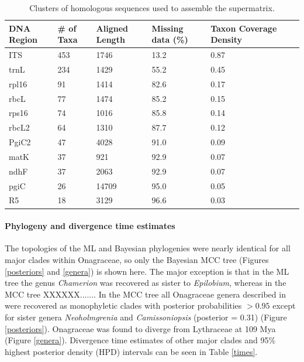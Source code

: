 \documentclass[review]{elsarticle}
\begin{document}
\begin{table}
   \center
   \begin{adjustbox}{max width=\textwidth}
      \begin{tabular}{lllllll}
         \toprule
         DNA Region & \# of Taxa & Aligned Length & Missing data (\%) & Taxon Coverage Density \\ 
	 \midrule
         ITS & 453 & 1746 & 13.2 & 0.87 \\
         trnL & 234 & 1429 & 55.2 & 0.45 \\
         rpl16 & 91 & 1414 & 82.6 & 0.17 \\
         rbcL & 77 & 1474 & 85.2 & 0.15 \\
         rps16 & 74 & 1016 & 85.8 & 0.14 \\
         rbcL2 & 64 & 1310 & 87.7 & 0.12 \\
         PgiC2 & 47 & 4028 & 91.0 & 0.09 \\
         matK & 37 & 921 & 92.9 & 0.07 \\
         ndhF & 37 & 2063 & 92.9 & 0.07 \\
         pgiC & 26 & 14709 & 95.0 & 0.05 \\
         R5 & 18 & 3129 & 96.6 & 0.03 \\
         \bottomrule
      \end{tabular}
   \end{adjustbox}
   \caption{Clusters of homologous sequences used to assemble the supermatrix.}
   \label{clusters}
\end{table}

\paragraph{Phylogeny and divergence time estimates}
The topologies of the ML and Bayesian phylogenies were nearly identical for all major clades within Onagraceae, 
so only the Bayesian MCC tree (Figures \ref{posteriors} and \ref{genera}) is shown here.
The major exception is that in the ML tree the genus \textit{Chamerion} was recovered
as sister to \textit{Epilobium}, whereas in the MCC tree XXXXXX.......
In the MCC tree all Onagraceae genera described in \citet{wagner2007revised} were recovered as monophyletic clades with posterior probabilities $> 0.95$
except for sister genera \textit{Neoholmgrenia} and \textit{Camissoniopsis} (posterior = 0.31) (Figure \ref{posteriors}).
Onagraceae was found to diverge from Lythraceae at 109 Mya (Figure \ref{genera}). 
Divergence time estimates of other major clades and 95\% highest posterior density (HPD) intervals can be seen in Table \ref{times}.
\end{document}
